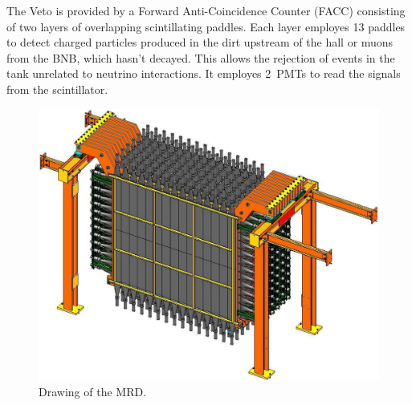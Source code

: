  The Veto is provided by a Forward Anti-Coincidence Counter (FACC) consisting of two layers %
 of overlapping scintillating paddles.
 Each layer employes 13 paddles to detect charged particles produced in the dirt %
 upstream of the hall or muons from the BNB, which hasn't decayed.
 This allows the rejection of events in the tank unrelated to neutrino interactions.
 It employes 2\inch~PMTs to read the signals from the scintillator.

 \begin{figure}
   \centering
   \includegraphics[scale=.15]{pics/pag23Nakajimathesis}
   \caption{Drawing of the MRD.}
   \label{fig:mrd}
 \end{figure}
 
